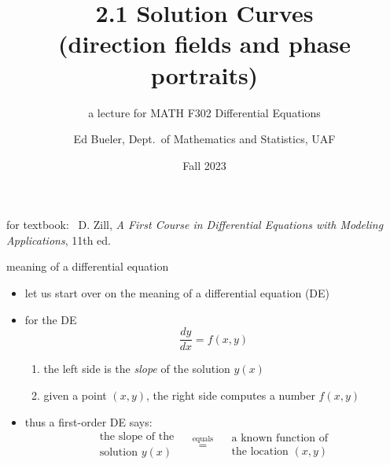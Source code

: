 \documentclass[colorlinks]{beamer}
\title{2.1 Solution Curves \\ (direction fields and phase portraits)}
\subtitle{a lecture for MATH F302 Differential Equations}
\author{Ed Bueler, Dept.~of Mathematics and Statistics, UAF}
\date{Fall 2023}
\begin{document}


\begin{frame}
\titlepage

\centerline{\tiny for textbook: \, D. Zill, \emph{A First Course in Differential Equations with Modeling Applications}, 11th ed.}
\end{frame}


\begin{frame}{meaning of a differential equation}

\begin{itemize}
\item let us start over on the meaning of a differential equation (DE)
\item for the DE
    $$\frac{dy}{dx} = f(x,y)$$

\vspace{-2mm}
    \begin{enumerate}
    \item the left side is the \emph{slope} of the solution $y(x)$
    \item given a point $(x,y)$, the right side computes a number $f(x,y)$
    \end{enumerate}
\item thus a first-order DE says:
    $$\begin{matrix}
    \text{the slope of the} \\
    \text{solution } y(x) 
    \end{matrix} \quad \stackrel{\text{equals}}{=} \quad
    \begin{matrix}
    \text{a known function of} \\
    \text{the location } (x,y)
    \end{matrix}$$
\end{itemize}
\end{frame}
\end{document}
